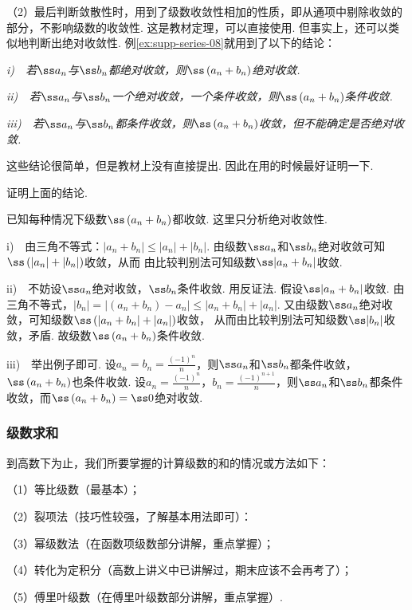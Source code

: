 （2）最后判断敛散性时，用到了级数收敛性相加的性质，即从通项中剔除收敛的部分，不影响级数的收敛性.
这是教材定理，可以直接使用.
但事实上，还可以类似地判断出绝对收敛性.
例\ref{ex:supp-series-08}就用到了以下的结论：\vspace{1em}

\textit{i)~~若$\ss a_n$与$\ss b_n$都绝对收敛，则$\ss \left( a_n + b_n \right)$绝对收敛.}

\textit{ii)~~若$\ss a_n$与$\ss b_n$一个绝对收敛，一个条件收敛，则$\ss \left( a_n + b_n \right)$条件收敛.}

\textit{iii)~~若$\ss a_n$与$\ss b_n$都条件收敛，则$\ss \left( a_n + b_n \right)$收敛，但不能确定是否绝对收敛.}\vspace{1.5em}

这些结论很简单，但是教材上没有直接提出.
因此在用的时候最好证明一下.

\begin{example}
\label{ex:supp-series-09}
证明上面的结论.
\end{example}

\begin{solution}
已知每种情况下级数$\ss \left( a_n + b_n \right)$都收敛.
    这里只分析绝对收敛性.

    i)~~由三角不等式：$|a_n + b_n| \le |a_n| + |b_n|$.
    由级数$\ss a_n$和$\ss b_n$绝对收敛可知$\ss \left( |a_n| + |b_n| \right)$收敛，从而
    由比较判别法可知级数$\ss | a_n + b_n |$收敛.

    ii)~~不妨设$\ss a_n$绝对收敛，$\ss b_n$条件收敛. 用反证法.
    假设$\ss |a_n + b_n|$收敛.
    由三角不等式，$|b_n| = |\left( a_n + b_n \right) - a_n| \le |a_n + b_n| + |a_n|$.
    又由级数$\ss a_n$绝对收敛，可知级数$\ss \left( |a_n + b_n| + |a_n| \right)$收敛，
    从而由比较判别法可知级数$\ss |b_n|$收敛，矛盾.
    故级数$\ss \left( a_n + b_n \right)$条件收敛.

    iii)~~举出例子即可.
    设$a_n = b_n = \frac{(-1)^n}{n}$，则$\ss a_n$和$\ss b_n$都条件收敛，$\ss \left( a_n + b_n\right)$也条件收敛.
    设$a_n = \frac{(-1)^n}{n}$，$b_n = \frac{(-1)^{n+1}}{n}$，则$\ss a_n$和$\ss b_n$都条件收敛，而$\ss \left( a_n + b_n\right) = \ss 0$绝对收敛.
\end{solution}

\subsubsection{级数求和}
到高数下为止，我们所要掌握的计算级数的和的情况或方法如下：

（1）等比级数（最基本）；\par
（2）裂项法（技巧性较强，了解基本用法即可）：\par
（3）幂级数法（在函数项级数部分讲解，重点掌握）；\par
（4）转化为定积分（高数上讲义中已讲解过，期末应该不会再考了）；\par
（5）傅里叶级数（在傅里叶级数部分讲解，重点掌握）.

